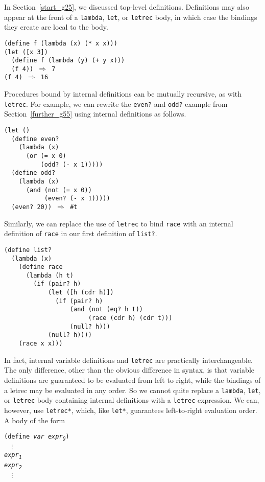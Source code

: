 \label{further_s80}\label{further_s81}In Section \ref{start_g25}, we
discussed top-level definitions.
Definitions may also appear at the front of a \texttt{lambda}, \texttt{let},
or \texttt{letrec} body, in which case the bindings they create are local
to the body.


\begin{alltt}
(define f (lambda (x) (* x x)))
(let ([x 3])
  (define f (lambda (y) (+ y x)))
  (f 4)) \(\Rightarrow\) 7
(f 4) \(\Rightarrow\) 16
\end{alltt}


Procedures bound by internal definitions can be mutually recursive,
as with \texttt{letrec}.
For example, we can rewrite the \label{further_s82}\texttt{even?} and \label{further_s83}\texttt{odd?} example
from Section \ref{further_g55}
using internal definitions as follows.


\begin{alltt}
(let ()
  (define even?
    (lambda (x)
      (or (= x 0)
          (odd? (- x 1)))))
  (define odd?
    (lambda (x)
      (and (not (= x 0))
           (even? (- x 1)))))
  (even? 20)) \(\Rightarrow\) \#{}t
\end{alltt}


Similarly, we can replace the use of \label{further_s84}\texttt{letrec} to bind \texttt{race}
with an internal definition of \texttt{race} in our first definition of
\label{further_s85}\texttt{list?}.


\begin{alltt}
(define list?
  (lambda (x)
    (define race
      (lambda (h t)
        (if (pair? h)
            (let ([h (cdr h)])
              (if (pair? h)
                  (and (not (eq? h t))
                       (race (cdr h) (cdr t)))
                  (null? h)))
            (null? h))))
    (race x x)))
\end{alltt}


In fact, internal variable definitions and \texttt{letrec} are practically interchangeable.
The only difference, other than the obvious difference in syntax, is that
variable definitions are guaranteed to be evaluated from left to right,
while the bindings of a letrec may be evaluated in any order.
So we cannot quite replace a
\texttt{lambda}, \texttt{let}, or
\texttt{letrec} body containing internal definitions with a \texttt{letrec} expression.
We can, however, use \texttt{letrec*}, which, like
\texttt{let*}, guarantees left-to-right evaluation order.
A body of the form


\begin{alltt}
(define \textit{var} \textit{expr\textsubscript{0}})
  \(\vdots\)
\textit{expr\textsubscript{1}}
\textit{expr\textsubscript{2}}
  \(\vdots\)
\end{alltt}


